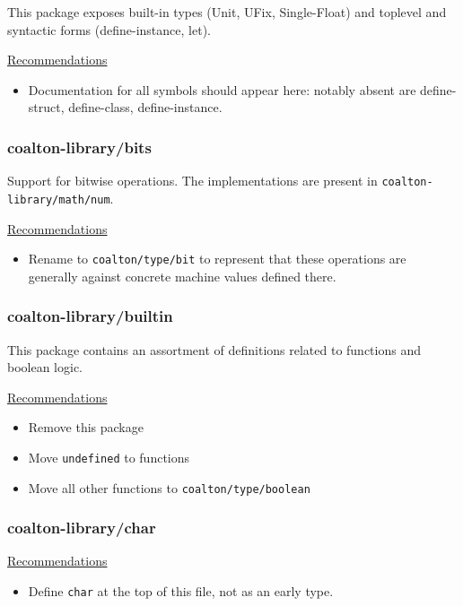 \documentclass[12pt]{article}
\newcommand{\code}{\texttt}
\begin{document}
This package exposes built-in types (Unit, UFix, Single-Float) and
toplevel and syntactic forms (define-instance, let).

\bigskip
\underline{Recommendations}

\begin{itemize}
\item Documentation for all symbols should appear here: notably absent
  are define-struct, define-class, define-instance.
\end{itemize}

\subsubsection{coalton-library/bits}

Support for bitwise operations. The implementations are present in \code{coalton-library/math/num}.

\bigskip
\underline{Recommendations}

\begin{itemize}
\item Rename to \code{coalton/type/bit} to represent that these operations are generally against concrete machine values defined there.
\end{itemize}

\subsubsection{coalton-library/builtin}

This package contains an assortment of definitions related to functions and boolean logic.

\bigskip
\underline{Recommendations}

\begin{itemize}
\item Remove this package
\item Move \code{undefined} to functions
\item Move all other functions to \code{coalton/type/boolean}
\end{itemize}

\subsubsection{coalton-library/char}

\bigskip
\underline{Recommendations}

\begin{itemize}
\item Define \code{char} at the top of this file, not as an early type.
\end{itemize}
\end{document}
